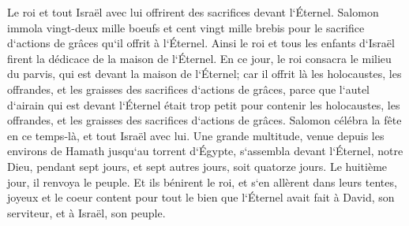 \verse Le roi et tout Israël avec lui offrirent des sacrifices devant l`Éternel. 
\verse Salomon immola vingt-deux mille boeufs et cent vingt mille brebis pour le sacrifice d`actions de grâces qu`il offrit à l`Éternel. Ainsi le roi et tous les enfants d`Israël firent la dédicace de la maison de l`Éternel. 
\verse En ce jour, le roi consacra le milieu du parvis, qui est devant la maison de l`Éternel; car il offrit là les holocaustes, les offrandes, et les graisses des sacrifices d`actions de grâces, parce que l`autel d`airain qui est devant l`Éternel était trop petit pour contenir les holocaustes, les offrandes, et les graisses des sacrifices d`actions de grâces. 
\verse Salomon célébra la fête en ce temps-là, et tout Israël avec lui. Une grande multitude, venue depuis les environs de Hamath jusqu`au torrent d`Égypte, s`assembla devant l`Éternel, notre Dieu, pendant sept jours, et sept autres jours, soit quatorze jours. 
\verse Le huitième jour, il renvoya le peuple. Et ils bénirent le roi, et s`en allèrent dans leurs tentes, joyeux et le coeur content pour tout le bien que l`Éternel avait fait à David, son serviteur, et à Israël, son peuple. 

\chapter{}

